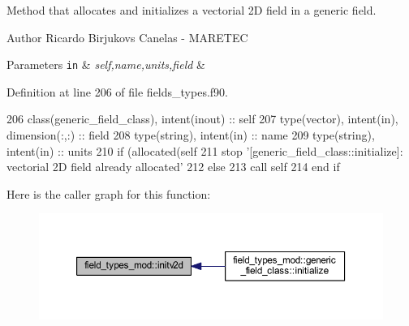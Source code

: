 Method that allocates and initializes a vectorial 2D field in a generic field. 

\begin{DoxyAuthor}{Author}
Ricardo Birjukovs Canelas -\/ M\+A\+R\+E\+T\+EC 
\end{DoxyAuthor}

\begin{DoxyParams}[1]{Parameters}
\mbox{\tt in}  & {\em self,name,units,field} & \\
\hline
\end{DoxyParams}


Definition at line 206 of file fields\+\_\+types.\+f90.


\begin{DoxyCode}
206     \textcolor{keywordtype}{class}(generic\_field\_class), \textcolor{keywordtype}{intent(inout)} :: self
207     \textcolor{keywordtype}{type}(vector), \textcolor{keywordtype}{intent(in)}, \textcolor{keywordtype}{dimension(:,:)} :: field
208     \textcolor{keywordtype}{type}(string), \textcolor{keywordtype}{intent(in)} :: name
209     \textcolor{keywordtype}{type}(string), \textcolor{keywordtype}{intent(in)} :: units
210     \textcolor{keywordflow}{if} (\textcolor{keyword}{allocated}(self%
211         stop \textcolor{stringliteral}{'[generic\_field\_class::initialize]: vectorial 2D field already allocated'}
212     \textcolor{keywordflow}{else}
213         \textcolor{keyword}{call }self%
214 \textcolor{keywordflow}{    end if}
\end{DoxyCode}
Here is the caller graph for this function\+:\nopagebreak
\begin{figure}[H]
\begin{center}
\leavevmode
\includegraphics[width=350pt]{namespacefield__types__mod_a26cb1df2a85bf21d45693942957c9dae_icgraph}
\end{center}
\end{figure}
\mbox{\label{namespacefield__types__mod_ae163912444021fda00f4d821d4c85721}} 
